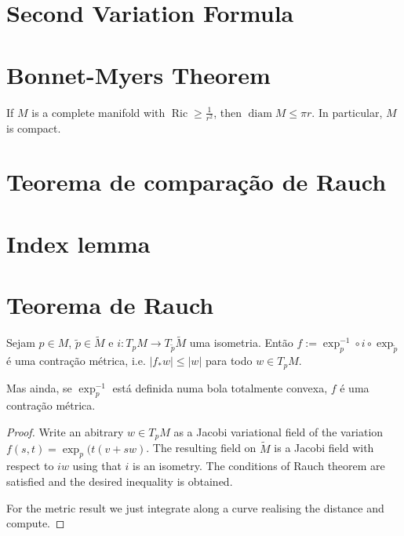 \section{Second Variation Formula}
\label{section-second-variation}


\section{Bonnet-Myers Theorem}
\label{subsection-bonnet-myers}

\begin{theorem}
\label{theorem-bonnet-myers}
If $M$ is a complete manifold with $\operatorname{Ric} \geq \frac{1}{r^2}$, then
$\operatorname{diam}M\leq \pi r$. In particular, $M$ is compact.
\end{theorem}

\section{Teorema de comparação de Rauch}
\label{section-rauch}

\section{Index lemma}
\label{subsection-index-lemma}

\section{Teorema de Rauch}
\label{subsection-rauch}

\begin{theorem}[Rauch]
\label{theorem-rauch}
\end{theorem}

\begin{proposition}
\label{proposition-contraction}
Sejam $p \in M$, $\tilde{p} \in \tilde{M}$ e $i:T_pM \to T_{\tilde{p}}\tilde{M}$
uma isometria. Então $f:=\operatorname{exp}^{-1}_p \circ i \circ
\operatorname{exp}_{\tilde{p}}$ é uma contração métrica, i.e. $|f_*w|\leq |w|$
para todo $w \in T_pM$.

Mas ainda, se $\operatorname{exp}_p^{-1}$ está definida numa bola totalmente
convexa, $f$ é uma contração métrica.
\end{proposition}

\begin{proof}
Write an abitrary $w\in T_p M$ as a Jacobi variational field of the variation 
$f(s,t)=\operatorname{exp}_p(t(v+sw)$. The resulting field on $\tilde{M}$ is a
Jacobi field with respect to $iw$ using that $i$ is an isometry. The conditions
of Rauch theorem are satisfied and the desired inequality is obtained.

For the metric result we just integrate along a curve realising the distance and
compute.
\end{proof}

